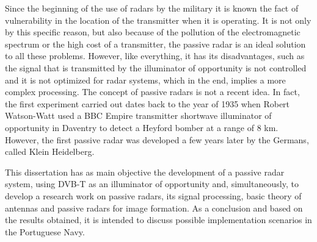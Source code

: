 \begin{abstractotherlanguage}



Since the beginning of the use of radars by the military it is known the fact of vulnerability in the location of the transmitter when it is operating. It is not only by this specific reason, but also because of the pollution of the electromagnetic spectrum or the high cost of a transmitter, the passive radar is an ideal solution to all these problems. However, like everything, it has its disadvantages, such as the signal that is transmitted by the illuminator of opportunity is not controlled and it is not optimized for radar systems, which in the end, implies a more complex processing.
The concept of passive radars is not a recent idea. In fact, the first experiment carried out dates back to the year of 1935 when Robert Watson-Watt used a BBC Empire transmitter shortwave illuminator of opportunity in Daventry to detect a Heyford bomber at a range of 8 km. However, the first passive radar was developed a few years later by the Germans, called Klein Heidelberg.\par 
This dissertation has as main objective the development of a passive radar system, using \gls{DVB-T} as an illuminator of opportunity and, simultaneously, to develop a research work on passive radars, its signal processing, basic theory of antennas and passive radars for image formation. As a conclusion and based on the results obtained, it is intended to discuss possible implementation scenarios in the Portuguese Navy.


\end{abstractotherlanguage}




\tableofcontents %

